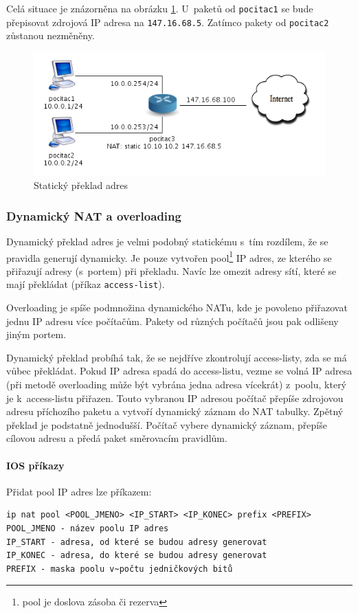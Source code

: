 Celá situace je znázorněna na obrázku \ref{fig:nat1}. U~paketů od \verb|pocitac1| se bude přepisovat zdrojová IP adresa na \verb|147.16.68.5|. Zatímco pakety od \verb|pocitac2| zůstanou nezměněny.

\begin{figure}[h]
\begin{center}
\includegraphics[width=12cm]{figures/nat1}
\caption{Statický překlad adres}
\label{fig:nat1}
\end{center}
\end{figure}

\newpage


\subsubsection{Dynamický NAT a overloading}
Dynamický překlad adres je velmi podobný statickému s~tím rozdílem, že se pravidla generují dynamicky. Je pouze vytvořen pool\footnote{pool je doslova zásoba či rezerva} IP adres, ze kterého se přiřazují adresy (s~portem) při překladu. Navíc lze omezit adresy sítí, které se mají překládat (příkaz \verb|access-list|).

Overloading je spíše podmnožina dynamického NATu, kde je povoleno přiřazovat jednu IP adresu více počítačům. Pakety od různých počítačů jsou pak odlišeny jiným portem.

Dynamický překlad probíhá tak, že se nejdříve zkontrolují access-listy, zda se má vůbec překládat. Pokud IP adresa spadá do access-listu, vezme se volná IP adresa (při metodě overloading může být vybrána jedna adresa vícekrát) z~poolu, který je k~access-listu přiřazen. Touto vybranou IP adresou počítač přepíše zdrojovou adresu příchozího paketu a vytvoří dynamický záznam do NAT tabulky. Zpětný překlad je podstatně jednodušší. Počítač vybere dynamický záznam, přepíše cílovou adresu a předá paket směrovacím pravidlům.

\paragraph{IOS příkazy}
Přidat pool IP adres lze příkazem:
\begin{verbatim}
ip nat pool <POOL_JMENO> <IP_START> <IP_KONEC> prefix <PREFIX>
POOL_JMENO - název poolu IP adres
IP_START - adresa, od které se budou adresy generovat
IP_KONEC - adresa, do které se budou adresy generovat
PREFIX - maska poolu v~počtu jedničkových bitů
\end{verbatim} 

